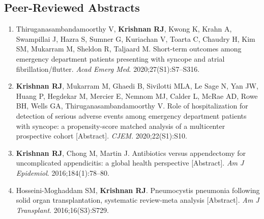 \documentclass[10.5pt,letterpaper]{article}
\newcommand{\myname}{\textbf{Krishnan RJ}}
\begin{document}
\subsection{Peer-Reviewed Abstracts}
\begin{enumerate}
\item Thiruganasambandamoorthy V, \myname, Kwong K, Krahn A, Swampillai J, Hazra S, Sumner G, Kuriachan V, Toarta C, Chaudry H, Kim SM, Mukarram M, Sheldon R, Taljaard M. Short-term outcomes among emergency department patients presenting with syncope and atrial fibrillation/flutter. \textit{Acad Emerg Med}. 2020;27(S1):S7--S316.
\item \myname, Mukarram M, Ghaedi B, Sivilotti MLA, Le Sage N, Yan JW, Huang P, Hegdekar M, Mercier E, Nemnom MJ, Calder L, McRae AD, Rowe BH, Wells GA, Thiruganasambandamoorthy V. Role of hospitalization for detection of serious adverse events among emergency department patients with syncope: a propensity-score matched analysis of a multicenter prospective cohort [Abstract]. \textit{CJEM}. 2020;22(S1):S10.
\item \myname, Chong M, Martin J. Antibiotics versus appendectomy for uncomplicated appendicitis: a global health perspective [Abstract]. \textit{Am J Epidemiol}. 2016;184(1):78--80.
\item Hosseini-Moghaddam SM, \myname. Pneumocystis pneumonia following solid organ transplantation, systematic review-meta analysis [Abstract]. \textit{Am J Transplant}. 2016;16(S3):S729.
\end{enumerate}
\end{document}
